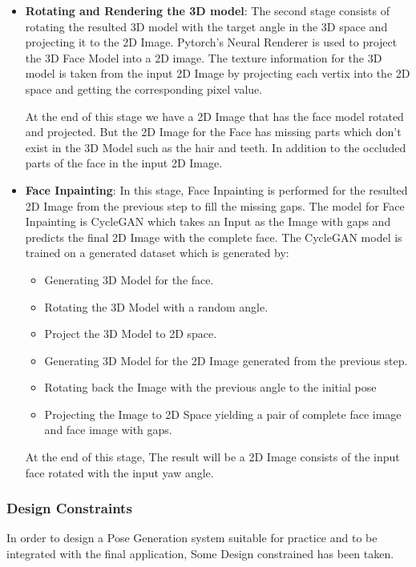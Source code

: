 \begin{itemize}
        \item \textbf{Rotating and Rendering the 3D model}: The second stage consists of rotating the resulted 3D model with the target angle in the 3D space and projecting it to the 2D Image. Pytorch's Neural Renderer is used to project the 3D Face Model into a 2D image. The texture information for the 3D model is taken from the input 2D Image by projecting each vertix into the 2D space and getting the corresponding pixel value.
        
        At the end of this stage we have a 2D Image that has the face model rotated and projected. But the 2D Image for the Face has missing parts which don't exist in the 3D Model such as the hair and teeth. In addition to the occluded parts of the face in the input 2D Image. 
        
        \item \textbf{Face Inpainting}: In this stage, Face Inpainting is performed for the resulted 2D Image from the previous step to fill the missing gaps. The model for Face Inpainting is CycleGAN which takes an Input as the Image with gaps and predicts the final 2D Image with the complete face. The CycleGAN model is trained on a generated dataset which is generated by: 
        \begin{itemize}
            \item Generating 3D Model for the face.
            \item Rotating the 3D Model with a random angle.
            \item Project the 3D Model to 2D space.
            \item Generating 3D Model for the 2D Image generated from the previous step.
            \item Rotating back the Image with the previous angle to the initial pose
            \item Projecting the Image to 2D Space yielding a pair of complete face image and face image with gaps.
        \end{itemize}
        
        At the end of this stage, The result will be a 2D Image consists of the input face rotated with the input yaw angle.

\end{itemize}

\subsubsection{Design Constraints}
In order to design a Pose Generation system suitable for practice and to be integrated with the final application, Some Design constrained has been taken.

